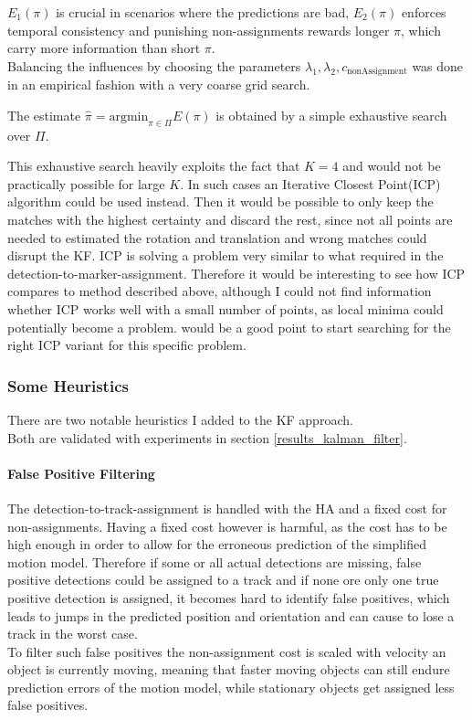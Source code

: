 \documentclass[12pt,a4paper]{article}
\begin{document}
$E_1(\pi)$ is crucial in scenarios where the predictions are bad, $E_2(\pi)$ enforces temporal consistency and punishing non-assignments rewards longer $\pi$, which carry more information than short $\pi$.\\
Balancing the influences by choosing the parameters $\lambda_1, \lambda_2, c_{\text{nonAssignment}}$ was done in an empirical fashion with a very coarse grid search. %

The estimate 
$
	\hat{\pi} = \text{argmin}_{\pi \in \Pi} E(\pi)
$
is obtained by a simple exhaustive search over $\Pi$.



This exhaustive search heavily exploits the fact that $K=4$ and would not be practically possible for large $K$. In such cases an Iterative Closest Point(ICP) \cite{icp} algorithm could be used instead. Then it would be possible to only keep the matches with the highest certainty and discard the rest, since not all points are needed to estimated the rotation and translation and wrong matches could disrupt the KF. ICP is solving a problem very similar to what required in the detection-to-marker-assignment. Therefore it would be interesting to see how ICP compares to method described above, although I could not find information whether ICP works well with a small number of points, as local minima could potentially become a problem. \cite{icp_review} would be a good point to start searching for the right ICP variant for this specific problem.



\subsubsection{Some Heuristics}
\label{heuristics}
There are two notable heuristics I added to the KF approach.\\ Both are validated with experiments in section \ref{results_kalman_filter}.

\paragraph{False Positive Filtering} The detection-to-track-assignment is handled with the HA and a fixed cost for non-assignments. Having a fixed cost however is harmful, as the cost has to be high enough in order to allow for the erroneous prediction of the simplified motion model. Therefore if some or all actual detections are missing, false positive detections could be assigned to a track and if none ore only one true positive detection is assigned, it becomes hard to identify false positives, which leads to jumps in the predicted position and orientation and can cause to lose a track in the worst case. \\
To filter such false positives the non-assignment cost is scaled with velocity an object is currently moving, meaning that faster moving objects can still endure prediction errors of the motion model, while stationary objects get assigned less false positives.
\end{document}
